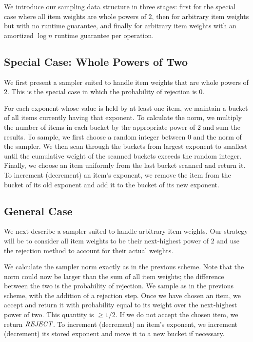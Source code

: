 \documentclass[11pt]{article}
\newcommand{\reject}{\emph{REJECT} }
\begin{document}
We introduce our sampling data structure in three stages: first
for the special case where all item weights are whole powers of $2$, then
for arbitrary item weights but with no runtime guarantee, and finally for
arbitrary item weights with an amortized  $\log n$ runtime guarantee per 
operation.

\subsection{Special Case: Whole Powers of Two} \label{sec:specialCase}
We first present a sampler suited to handle item weights that are whole powers 
of $2$.  This is the special case in which the probability of rejection is
$0$.

For each exponent whose value is held by at least one item, we maintain a
bucket 
of all items currently having that exponent.  To calculate the norm, we
multiply the number of items in each bucket by the
appropriate power of $2$ and sum the results.  To sample, we first choose a
random integer between $0$ and the norm of the
sampler. We then scan through the buckets from largest exponent to smallest
until the cumulative weight of the scanned buckets exceeds the random integer.
Finally, we choose an item uniformly from the last bucket scanned and return it.
To increment (decrement) an
item's exponent, we remove the item from the bucket of its old exponent and add
it to the bucket of its new exponent.

\subsection{General Case} \label{sec:generalCase}
We next describe a sampler suited to handle arbitrary item weights.  Our 
strategy will be to consider all item weights to be their next-highest power of
$2$ and use the rejection method to account for their actual
weights.  

We calculate the sampler norm exactly as in the previous scheme.
Note that the norm could now be larger than the sum of 
all item weights; the difference between the two is the probability of 
rejection.
We sample as in the previous scheme, with the addition of a rejection step.  
Once we have chosen an item, we accept and return it 
with probability equal to its weight over the next-highest power of two.  
This quantity is $\ge 1/2$.  If we do not accept the chosen item, we return 
$\reject$. To increment (decrement) an item's exponent, we increment 
(decrement) its stored exponent and move it to a new bucket if necessary.
\end{document}
